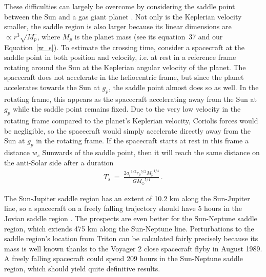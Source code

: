 \documentclass[fleqn,usenatbib,useAMS,onecolumn]{mnras} %
\begin{document}
These difficulties can largely be overcome by considering the saddle point between the Sun and a gas giant planet \citep{Penner_2020}. Not only is the Keplerian velocity smaller, the saddle region is also larger because its linear dimensions are $\propto r^3 \sqrt{M_p}$, where $M_p$ is the planet mass (see its equation~37 and our Equation~\ref{w_s}). To estimate the crossing time, consider a spacecraft at the saddle point in both position and velocity, i.e. at rest in a reference frame rotating around the Sun at the Keplerian angular velocity of the planet. The spacecraft does not accelerate in the heliocentric frame, but since the planet accelerates towards the Sun at $g_p$, the saddle point almost does so as well. In the rotating frame, this appears as the spacecraft accelerating away from the Sun at $g_p$ while the saddle point remains fixed. Due to the very low velocity in the rotating frame compared to the planet's Keplerian velocity, Coriolis forces would be negligible, so the spacecraft would simply accelerate directly away from the Sun at $g_p$ in the rotating frame. If the spacecraft starts at rest in this frame a distance $w_s$ Sunwards of the saddle point, then it will reach the same distance on the anti-Solar side after a duration
\begin{eqnarray}
    T_s ~=~ \frac{2 {a_{_0}}^{1/2} {r_p}^{5/2} {M_p}^{1/4}}{G{M_\odot}^{5/4}} \, .
    \label{t_s}
\end{eqnarray}

The Sun-Jupiter saddle region has an extent of 10.2 km along the Sun-Jupiter line, so a spacecraft on a freely falling trajectory should have 5 hours in the Jovian saddle region \citep{Penner_2020}. The prospects are even better for the Sun-Neptune saddle region, which extends 475 km along the Sun-Neptune line. Perturbations to the saddle region's location from Triton can be calculated fairly precisely because its mass is well known thanks to the Voyager 2 close spacecraft flyby in August 1989. A freely falling spacecraft could spend 209 hours in the Sun-Neptune saddle region, which should yield quite definitive results.
\end{document}

